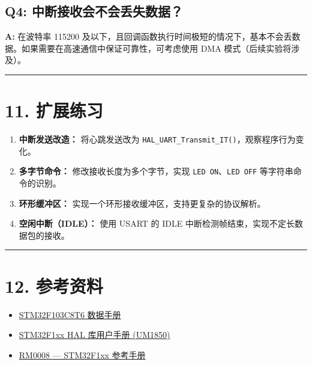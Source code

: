 \documentclass[
  chinese,
  UTF8,
  oneside,
  openany]{ctexbook}
\providecommand{\tightlist}{%
  \setlength{\itemsep}{0pt}\setlength{\parskip}{0pt}}
\begin{document}
\subsection{Q4:
中断接收会不会丢失数据？}\label{q4-ux4e2dux65adux63a5ux6536ux4f1aux4e0dux4f1aux4e22ux5931ux6570ux636e}

\textbf{A:} 在波特率 115200
及以下，且回调函数执行时间极短的情况下，基本不会丢数据。如果需要在高速通信中保证可靠性，可考虑使用
DMA 模式（后续实验将涉及）。

\begin{center}\rule{0.5\linewidth}{0.5pt}\end{center}

\section{11. 扩展练习}\label{ux6269ux5c55ux7ec3ux4e60-1}

\begin{enumerate}
\def\labelenumi{\arabic{enumi}.}
\item
  \textbf{中断发送改造：} 将心跳发送改为
  \texttt{HAL\_UART\_Transmit\_IT()}，观察程序行为变化。
\item
  \textbf{多字节命令：} 修改接收长度为多个字节，实现
  \texttt{LED\ ON}、\texttt{LED\ OFF} 等字符串命令的识别。
\item
  \textbf{环形缓冲区：} 实现一个环形接收缓冲区，支持更复杂的协议解析。
\item
  \textbf{空闲中断（IDLE）：} 使用 USART 的 IDLE
  中断检测帧结束，实现不定长数据包的接收。
\end{enumerate}

\begin{center}\rule{0.5\linewidth}{0.5pt}\end{center}

\section{12. 参考资料}\label{ux53c2ux8003ux8d44ux6599-1}

\begin{itemize}
\tightlist
\item
  \href{https://www.st.com/resource/en/datasheet/stm32f103c8.pdf}{STM32F103C8T6
  数据手册}
\item
  \href{https://www.st.com/resource/en/user_manual/um1850-description-of-stm32f1-hal-and-lowlayer-drivers-stmicroelectronics.pdf}{STM32F1xx
  HAL 库用户手册 (UM1850)}
\item
  \href{https://www.st.com/resource/en/reference_manual/rm0008-stm32f101xx-stm32f102xx-stm32f103xx-stm32f105xx-and-stm32f107xx-advanced-armbased-32bit-mcus-stmicroelectronics.pdf}{RM0008
  --- STM32F1xx 参考手册}
\end{itemize}
\end{document}
